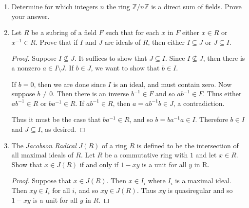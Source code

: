 \documentclass{article}
\theoremstyle{definition}
\begin{document}
\begin{enumerate}
\begin{proof}
                    First we show that $R$ has an identity element. By the surjectivity of $\phi$ there must be an element $e\in R$ such that $x=\phi(e)=ex$. Now let $b\in R$. Then by the surjectivity of $\phi$ there is an element $y_b\in R$ such that $b=\phi(y_b)=y_bx$. Now we have $b=y_bx=y_bex=(y_bx)e=be$. Thus $e=1$ since it fixes every element in $R$. 

                    Now again by the surjectivity of $\phi$, we must have some $r\in R$ such that $\phi(r)=rx=1$. Thus $x$ is a unit and since the choice of $x$ was arbitrary (except for the restriction of $x$ being nonzero), we conclude that $R$ must be a field.
                \end{proof}

            \item Determine for which integers $n$ the ring $\mathbb{Z}/n\mathbb{Z}$ is a direct sum of fields. Prove your answer.
            
            \item Let $R$ be a subring of a field $F$ such that for each $x$ in $F$ either $x\in R$ or $x^{-1}\in R$. Prove that if $I$ and $J$ are ideals of $R$, then either $I\subseteq J$ or $J\subseteq I$.
            
            \begin{proof}
                Suppose $I\nsubseteq J$. It suffices to show that $J\subseteq I$. Since $I \nsubseteq J$, then there is a nonzero $a\in I\setminus J$. If $b\in J$, we want to show that $b\in I$. 

                If $b=0$, then we are done since $I$ is an ideal, and must contain zero. Now suppose $b\neq 0$. Then there is an inverse $b^{-1}\in F$ and so $ab^{-1}\in F$. Thus either $ab^{-1}\in R$ or $ba^{-1}\in R$. If $ab^{-1}\in R$, then $a=ab^{-1}b\in J$, a contradiction. 
                
                Thus it must be the case that $ba^{-1}\in R$, and so $b=ba^{-1}a\in I$. Therefore $b\in I$ and $J\subseteq I$, as desired. 
            \end{proof}

            \item The \textit{Jacobson Radical} $J(R)$ of a ring $R$ is defined to be the intersection of all maximal ideals of $R$. Let $R$ be a commutative ring with $1$ and let $x\in R$. Show that $x\in J(R)$ if and only if $1-xy$ is a unit for all $y$ in R.
            
            \begin{proof}
                Suppose that $x\in J(R)$. Then $x\in I_i$ where $I_i$ is a maximal ideal. Then $xy\in I_i$ for all $i$, and so $xy\in J(R)$. Thus $xy$ is quasiregular and so $1-xy$ is a unit for all $y$ in $R$.


\end{proof}
\end{enumerate}
\end{document}
